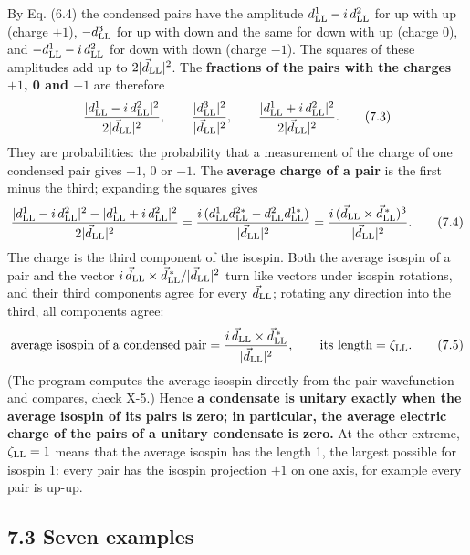 \documentclass[
  10pt,
]{article}
\begin{document}
By Eq. (6.4) the condensed pairs have the amplitude
\(d^1_{\rm LL}-i\,d^2_{\rm LL}\) for up with up (charge \(+1\)),
\(-d^3_{\rm LL}\) for up with down and the same for down with up (charge
0), and \(-d^1_{\rm LL}-i\,d^2_{\rm LL}\) for down with down (charge
\(-1\)). The squares of these amplitudes add up to
\(2\lvert\vec d_{\rm LL}\rvert^2\). The \textbf{fractions of the pairs
with the charges \(+1\), 0 and \(-1\)} are therefore
\[\frac{\lvert d^1_{\rm LL}-i\,d^2_{\rm LL}\rvert^2}{2\lvert\vec d_{\rm LL}\rvert^2},\qquad\frac{\lvert d^3_{\rm LL}\rvert^2}{\lvert\vec d_{\rm LL}\rvert^2},\qquad\frac{\lvert d^1_{\rm LL}+i\,d^2_{\rm LL}\rvert^2}{2\lvert\vec d_{\rm LL}\rvert^2}. \tag{7.3}\]
They are probabilities: the probability that a measurement of the charge
of one condensed pair gives \(+1\), 0 or \(-1\). The \textbf{average
charge of a pair} is the first minus the third; expanding the squares
gives
\[\frac{\lvert d^1_{\rm LL}-i\,d^2_{\rm LL}\rvert^2-\lvert d^1_{\rm LL}+i\,d^2_{\rm LL}\rvert^2}{2\lvert\vec d_{\rm LL}\rvert^2}=\frac{i\,(d^1_{\rm LL}d^{2*}_{\rm LL}-d^2_{\rm LL}d^{1*}_{\rm LL})}{\lvert\vec d_{\rm LL}\rvert^2}=\frac{i\,(\vec d_{\rm LL}\times\vec d^{\,*}_{\rm LL})^3}{\lvert\vec d_{\rm LL}\rvert^2}. \tag{7.4}\]
The charge is the third component of the isospin. Both the average
isospin of a pair and the vector
\(i\,\vec d_{\rm LL}\times\vec d^{\,*}_{\rm LL}/\lvert\vec d_{\rm LL}\rvert^2\)
turn like vectors under isospin rotations, and their third components
agree for every \(\vec d_{\rm LL}\); rotating any direction into the
third, all components agree:
\[\text{average isospin of a condensed pair}=\frac{i\,\vec d_{\rm LL}\times\vec d^{\,*}_{\rm LL}}{\lvert\vec d_{\rm LL}\rvert^2},\qquad\text{its length}=\zeta_{\rm LL}. \tag{7.5}\]
(The program computes the average isospin directly from the pair
wavefunction and compares, check X-5.) Hence \textbf{a condensate is
unitary exactly when the average isospin of its pairs is zero; in
particular, the average electric charge of the pairs of a unitary
condensate is zero.} At the other extreme, \(\zeta_{\rm LL}=1\) means
that the average isospin has the length 1, the largest possible for
isospin 1: every pair has the isospin projection \(+1\) on one axis, for
example every pair is up-up.

\hypertarget{seven-examples}{%
\subsection{7.3 Seven examples}\label{seven-examples}}
\end{document}
